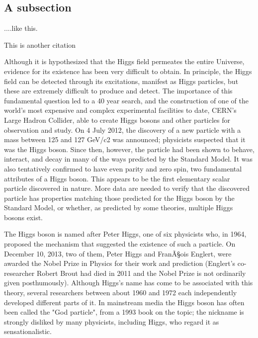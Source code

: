 \documentclass[twocolumn]{revtex4}
\begin{document}
\subsection{A subsection}
....like this. 

This is another citation \cite{Weinberg:1967tq}

Although it is hypothesized that the Higgs field permeates the entire Universe, evidence for its existence has been very difficult to obtain. In principle, the Higgs field can be detected through its excitations, manifest as Higgs particles, but these are extremely difficult to produce and detect. The importance of this fundamental question led to a 40 year search, and the construction of one of the world's most expensive and complex experimental facilities to date, CERN's Large Hadron Collider, able to create Higgs bosons and other particles for observation and study. On 4 July 2012, the discovery of a new particle with a mass between 125 and 127 GeV/c2 was announced; physicists suspected that it was the Higgs boson. Since then, however, the particle had been shown to behave, interact, and decay in many of the ways predicted by the Standard Model. It was also tentatively confirmed to have even parity and zero spin, two fundamental attributes of a Higgs boson. This appears to be the first elementary scalar particle discovered in nature. More data are needed to verify that the discovered particle has properties matching those predicted for the Higgs boson by the Standard Model, or whether, as predicted by some theories, multiple Higgs bosons exist.

The Higgs boson is named after Peter Higgs, one of six physicists who, in 1964, proposed the mechanism that suggested the existence of such a particle. On December 10, 2013, two of them, Peter Higgs and FranÃ§ois Englert, were awarded the Nobel Prize in Physics for their work and prediction (Englert's co-researcher Robert Brout had died in 2011 and the Nobel Prize is not ordinarily given posthumously). Although Higgs's name has come to be associated with this theory, several researchers between about 1960 and 1972 each independently developed different parts of it. In mainstream media the Higgs boson has often been called the "God particle", from a 1993 book on the topic; the nickname is strongly disliked by many physicists, including Higgs, who regard it as sensationalistic.
\end{document}
